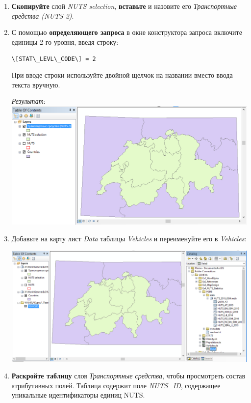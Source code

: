 \documentclass[12pt,]{book}
\begin{document}
\begin{enumerate}
\def\labelenumi{\arabic{enumi}.}
\item
  \textbf{Скопируйте} слой \emph{NUTS selection}, \textbf{вставьте} и назовите его \emph{Транспортные средства (NUTS 2)}.
\item
  С помощью \textbf{определяющего запроса} в окне конструктора запроса включите единицы 2-го уровня, введя строку:

  \texttt{\textbackslash{}{[}STAT\textbackslash{}\_LEVL\textbackslash{}\_CODE\textbackslash{}{]}\ =\ 2}

  При вводе строки используйте двойной щелчок на названии вместо ввода текста вручную.

  \emph{Результат}:
  \includegraphics{images/Ex08/image20.png}
\item
  Добавьте на карту лист \emph{Data} таблицы \emph{Vehicles} и переименуйте его в \emph{Vehicles}:

  \includegraphics{images/Ex08/image21.png}
\item
  \textbf{Раскройте таблицу} слоя \emph{Транспортные средства}, чтобы просмотреть состав атрибутивных полей. Таблица содержит поле \emph{NUTS\_ID}, содержащее уникальные идентификаторы единиц NUTS.


\end{enumerate}
\end{document}
